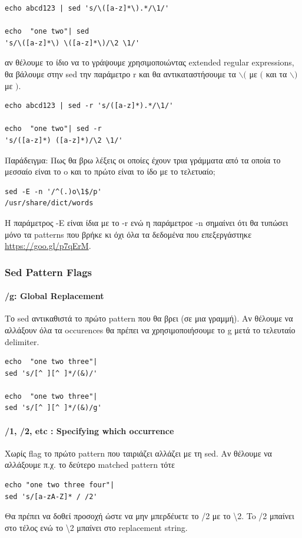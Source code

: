 \begin{lstlisting}
echo abcd123 | sed 's/\([a-z]*\).*/\1/'

echo  "one two"| sed 
's/\([a-z]*\) \([a-z]*\)/\2 \1/'
\end{lstlisting}

αν θέλουμε το ίδιο να το γράψουμε χρησιμοποιώντας extended regular expressions, θα βάλουμε στην sed την παράμετρο \-r και θα αντικαταστήσουμε τα $\backslash($ με $($ και τα $\backslash)$ με $)$.

\begin{lstlisting}
echo abcd123 | sed -r 's/([a-z]*).*/\1/'

echo  "one two"| sed -r
's/([a-z]*) ([a-z]*)/\2 \1/'
\end{lstlisting}


Παράδειγμα: Πως θα βρω λέξεις οι οποίες έχουν τρια γράμματα από τα οποία το μεσσαίο είναι το o και το πρώτο είναι το ίδο με το τελετυαίο;

\begin{lstlisting}
sed -E -n '/^(.)o\1$/p' 
/usr/share/dict/words
\end{lstlisting}

Η παράμετρος -Ε είναι ίδια με το -r ενώ η παράμετροε -n σημαίνει ότι θα τυπώσει μόνο τα patterns που βρήκε κι όχι όλα τα δεδομένα που επεξεργάστηκε \href{https://goo.gl/p7qErM}{https://goo.gl/p7qErM}.
\subsubsection{Sed Pattern Flags}
\paragraph{/g: Global Replacement}
Το sed αντικαθιστά το πρώτο pattern που θα βρει (σε μια γραμμή). Αν θέλουμε να αλλάξουν όλα τα occurences θα πρέπει να χρησιμοποιήσουμε το g μετά το τελευταίο delimiter.

\begin{lstlisting}
echo  "one two three"| 
sed 's/[^ ][^ ]*/(&)/'

echo  "one two three"| 
sed 's/[^ ][^ ]*/(&)/g'
\end{lstlisting} 

\paragraph{/1, /2, etc : Specifying which occurrence}
Χωρίς flag το πρώτο pattern που ταιριάζει αλλάζει με τη sed. Aν θέλουμε να αλλάξουμε π.χ. το δεύτερο matched pattern τότε 
\begin{lstlisting}
echo "one two three four"| 
sed 's/[a-zA-Z]* / /2'
\end{lstlisting}
Θα πρέπει να δοθεί προσοχή ώστε να μην μπερδέυετε το /2 με το \textbackslash 2. To /2 μπαίνει στο τέλος ενώ το \textbackslash 2 μπαίνει στο replacement string.

